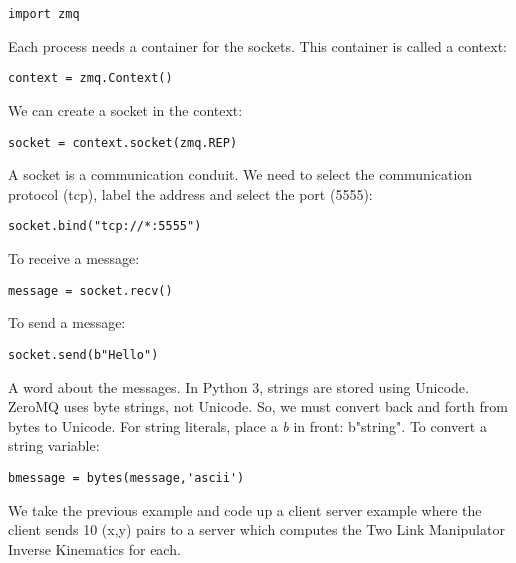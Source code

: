 \begin{verbatim}
import zmq
\end{verbatim}

Each process needs a container for the sockets. This container is called
a context:

\begin{verbatim}
context = zmq.Context()
\end{verbatim}

We can create a socket in the context:

\begin{verbatim}
socket = context.socket(zmq.REP)
\end{verbatim}

A socket is a communication conduit. We need to select the communication
protocol (tcp), label the address and select the port (5555):

\begin{verbatim}
socket.bind("tcp://*:5555")
\end{verbatim}

To receive a message:

\begin{verbatim}
message = socket.recv()
\end{verbatim}

To send a message:

\begin{verbatim}
socket.send(b"Hello")
\end{verbatim}

A word about the messages. In Python 3, strings are stored using
Unicode. ZeroMQ uses byte strings, not Unicode. So, we must convert back
and forth from bytes to Unicode. For string literals, place a \emph{b}
in front: b"string". To convert a string variable:

\begin{verbatim}
bmessage = bytes(message,'ascii')
\end{verbatim}

We take the previous example and code up a client server example where
the client sends 10 (x,y) pairs to a server which computes the Two Link
Manipulator Inverse Kinematics for each.

